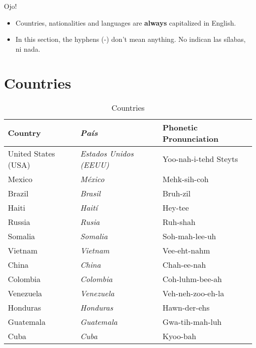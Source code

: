 
\begin{conf}{\textexclamdown Ojo!}
	\begin{itemize}
		\item Countries, nationalities and languages are \textbf{always}
			capitalized in English.
		\item In this section, the hyphens (-) don't mean anything.
			No indican las sílabas, ni nada.
	\end{itemize}
\end{conf}

\section{Countries}


\begin{table}[H]
	\center
	\begin{tabular}{lll}
	\toprule
	\textbf{Country} & \textbf{\emph{Pa\'is}} & \textbf{Phonetic Pronunciation} \\
	\midrule
	United States (USA) & \emph{Estados Unidos (EEUU)} & Yoo-nah-i-tehd Steyts \\
	Mexico & \emph{México} & Mehk-sih-coh \\
	Brazil & \emph{Brasil} & Bruh-zil \\
	Haiti & \emph{Haití} & Hey-tee \\
	Russia & \emph{Rusia} & Ruh-shah \\
	Somalia & \emph{Somalia} & Soh-mah-lee-uh \\
	Vietnam & \emph{Vietnam} & Vee-eht-nahm \\
	China & \emph{China} & Chah-ee-nah \\
	Colombia & \emph{Colombia} & Coh-luhm-bee-ah \\
	Venezuela & \emph{Venezuela} & Veh-neh-zoo-eh-la \\
	Honduras & \emph{Honduras} & Hawn-der-ehs \\
	Guatemala & \emph{Guatemala} & Gwa-tih-mah-luh \\
	Cuba & \emph{Cuba} & Kyoo-bah \\
	\bottomrule
	\end{tabular}
	\caption{Countries}
\end{table}

